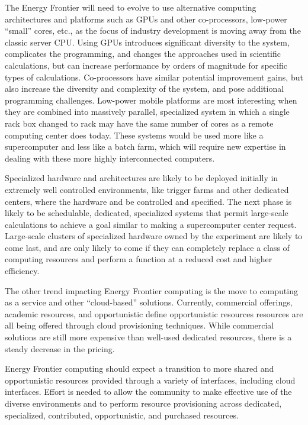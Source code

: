 The Energy Frontier will need to evolve to use alternative computing
architectures and platforms such as GPUs and other co-processors,  low-power
``small'' cores, etc., as the focus of industry development is moving away from
the classic server CPU.  Using GPUs introduces significant diversity to the
system, complicates the programming, and changes the approaches used in
scientific calculations, but can increase performance by orders of magnitude
for specific types of calculations.  Co-processors have similar potential
improvement gains, but also increase the diversity and complexity of the
system, and pose additional programming challenges.  Low-power mobile
platforms are most interesting when they are combined into massively parallel,
specialized system in which a single rack {\color{red} box changed to rack} may have the same number of cores as a
remote computing center does today.  These systems would be used more like a
supercomputer and less like a batch farm, which will require new
expertise in dealing with these more highly interconnected computers.

Specialized hardware and architectures are likely to be deployed initially in
extremely well controlled environments, like trigger farms and other dedicated
centers, where the hardware and be controlled and specified. The next phase is
likely to be schedulable, dedicated, specialized systems that permit large-scale
calculations to achieve a goal similar to making a supercomputer center
request.  Large-scale clusters of specialized hardware owned by the experiment
are likely to come last, and are only likely to come if they can completely
replace a class of computing resources and perform a function at a reduced
cost and higher efficiency.

The other trend impacting Energy Frontier computing is the move to computing as a service
and other ``cloud-based'' solutions.  Currently,  commercial offerings, academic
resources, and opportunistic {\color{red} define opportunistic resources} resources are all being offered through cloud
provisioning techniques.  While commercial solutions are still more expensive
than well-used dedicated resources, there is a steady decrease in the pricing.

Energy Frontier computing should expect a transition to more shared and opportunistic
resources provided through a variety of interfaces, including cloud
interfaces.   Effort is needed to allow the community to make effective use of
the diverse environments and to perform resource provisioning across
dedicated, specialized, contributed, opportunistic, and purchased resources.

